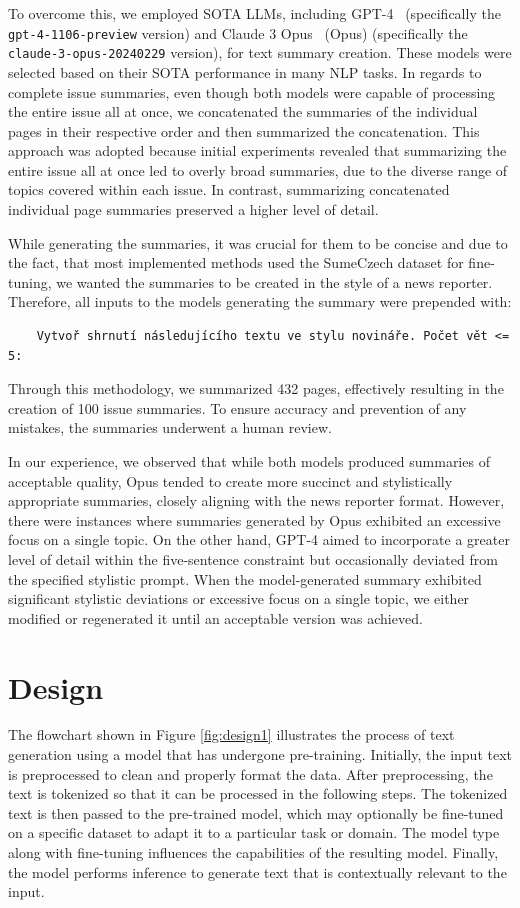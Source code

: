 \documentclass[english, ba, kiv, he, iso690numb, pdf, viewonly]{fasthesis}
\begin{document}
To overcome this, we employed SOTA LLMs, including GPT-4~\cite{openai2024gpt4} (specifically the \texttt{gpt-4-1106-preview} version) and Claude 3 Opus~\cite{anthropic-2024} (Opus) (specifically the \texttt{claude-3-opus-20240229} version), for text summary creation. These models were selected based on their SOTA performance in many NLP tasks. In regards to complete issue summaries, even though both models were capable of processing the entire issue all at once, we concatenated the summaries of the individual pages in their respective order and then summarized the concatenation. This approach was adopted because initial experiments revealed that summarizing the entire issue all at once led to overly broad summaries, due to the diverse range of topics covered within each issue. In contrast, summarizing concatenated individual page summaries preserved a higher level of detail.

While generating the summaries, it was crucial for them to be concise and due to the fact, that most implemented methods used the SumeCzech dataset for fine-tuning, we wanted the summaries to be created in the style of a news reporter. Therefore, all inputs to the models generating the summary were prepended with:
\lstset{style=plainsrc, numbers=none, breaklines=true, 	breakatwhitespace=True,}
\begin{lstlisting}
	Vytvoř shrnutí následujícího textu ve stylu novináře. Počet vět <= 5:
\end{lstlisting}
Through this methodology, we summarized 432 pages, effectively resulting in the creation of 100 issue summaries. To ensure accuracy and prevention of any mistakes, the summaries underwent a human review. 

In our experience, we observed that while both models produced summaries of acceptable quality, Opus tended to create more succinct and stylistically appropriate summaries, closely aligning with the news reporter format. However, there were instances where summaries generated by Opus exhibited an excessive focus on a single topic. On the other hand, GPT-4 aimed to incorporate a greater level of detail within the five-sentence constraint but occasionally deviated from the specified stylistic prompt. 
When the model-generated summary exhibited significant stylistic deviations or excessive focus on a single topic, we either modified or regenerated it until an acceptable version was achieved.

\section{Design}
The flowchart shown in Figure \ref{fig:design1} illustrates the process of text generation using a model that has undergone pre-training. Initially, the input text is preprocessed to clean and properly format the data. After preprocessing, the text is tokenized so that it can be processed in the following steps. The tokenized text is then passed to the pre-trained model, which may optionally be fine-tuned on a specific dataset to adapt it to a particular task or domain. The model type along with fine-tuning influences the capabilities of the resulting model. Finally, the model performs inference to generate text that is contextually relevant to the input.
\end{document}
